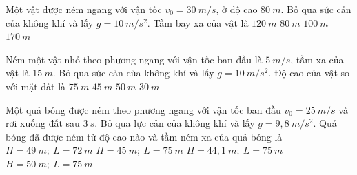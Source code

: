 \begin{ex}%
Một vật được ném ngang với vận tốc $v_0 = 30\ m/s$, ở độ cao $80\ m$. Bỏ qua sức cản của không khí và lấy $g = 10\ m/s^2$. Tầm bay xa của vật là
\choice
{\True $120\ m$}
{$80\ m$}
{$100\ m$}
{$170\ m$}
 \end{ex}
\begin{ex}%
Ném một vật nhỏ theo phương ngang với vận tốc ban đầu là $5\ m/s$, tầm xa của vật là $15\ m$. Bỏ qua sức cản của không khí và lấy $g = 10\ m/s^2$. Độ cao của vật so với mặt đất là
\choice
{$75\ m$}
{\True $45\ m$}
{$50\ m$}
{$30\ m$}

\loigiai{
}
 \end{ex}
\begin{ex}%
Một quả bóng được ném theo phương ngang với vận tốc ban đầu $v_0 = 25\ m/s$ và rơi xuống đất sau $3\ s$. Bỏ qua lực cản của không khí và lấy $g = 9,8\ m/s^2$. Quả bóng đã được ném từ độ cao nào và tầm ném xa của quả bóng là
\choice
{$H=49\ m;\ L=72\ m$}
{$H=45\ m;\ L=75\ m$}
{\True $H=44,1\ m;\ L=75\ m$}
{$H=50\ m;\ L=75\ m$}
 \end{ex}

